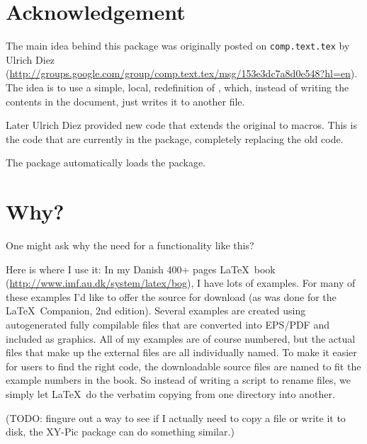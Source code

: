 \documentclass[11pt,a4paper,oldfontcommands,danish,english,article,oneside]{memoir}
\begin{document}
\section{Acknowledgement}

The main idea behind this package was originally posted on
\texttt{comp.text.tex} by Ulrich Diez
(\url{http://groups.google.com/group/comp.text.tex/msg/153e3dc7a8d0e548?hl=en}).
The idea is to use a simple, local, redefinition of
, which, instead of writing the contents
in the document, just writes it to another file.

Later Ulrich Diez provided new code that extends the original to
macros. This is the code that are currently in the \texttt{\jobname}
package, completely replacing the old code.

The \textsf{\jobname} package automatically loads the
 package.


\section{Why?}
\label{sec:why}

One might ask why the need for a functionality like this?

Here is where I use it: In my Danish 400+ pages \LaTeX\ book
(\url{http://www.imf.au.dk/system/latex/bog}), I have lots of
examples. For many of these examples I'd like to offer the source for
download (as was done for the \LaTeX\ Companion, 2nd edition). Several
examples are created using autogenerated fully compilable files that
are converted into EPS/PDF and included as graphics.  All of my
examples are of course numbered, but the actual files that make up the
external files are all individually named. To make it easier for users
to find the right code, the downloadable source files are named to fit
the example numbers in the book. So instead of writing a script to
rename files, we simply let \LaTeX\ do the verbatim copying from one
directory into another.

(TODO: fingure out a way to see if I actually need to copy a file or
write it to disk, the XY-Pic package can do something similar.)
\end{document}
